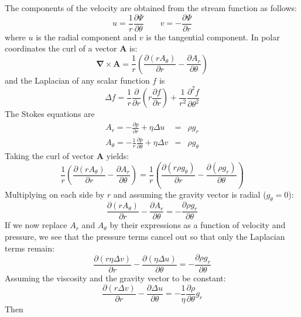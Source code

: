 

The components of the velocity are obtained from the stream function as follows:
\[
u = \frac{1}{r}\frac{\partial \Psi}{\partial \theta}
\quad\quad
v = - \frac{\partial \Psi}{\partial r}
\]
where $u$ is the radial component and $v$ is the tangential component.
In polar coordinates the curl of a vector ${\bm A}$ is:
\[
{\bm \nabla}\times {\bm A}
=
\frac{1}{r}\left(  
\frac{\partial (r A_\theta)}{\partial r}
-
\frac{\partial A_r}{\partial \theta}
\right)
\]
and the Laplacian of any scalar function $f$ is 
\[
\Delta f = \frac{1}{r} \frac{\partial }{\partial r} \left( r  \frac{\partial f}{\partial r} \right) 
+  \frac{1}{r^2} \frac{\partial^2 f}{\partial \theta^2} 
\]
The Stokes equations are
\begin{eqnarray}
A_r=-\frac{\partial p}{\partial r} + \eta \Delta u &=& \rho g_r \\
A_\theta=-\frac{1}{r}\frac{\partial p}{\partial \theta} + \eta \Delta v &=& \rho g_\theta 
\end{eqnarray}
Taking the curl of vector ${\bm A}$ yields:
\[
\frac{1}{r}\left(  
\frac{\partial (r A_\theta)}{\partial r}
- \frac{\partial A_r}{\partial \theta}
\right)
=
\frac{1}{r}\left(  
\frac{\partial (r \rho g_\theta)}{\partial r}
- \frac{\partial (\rho g_r)}{\partial \theta}
\right)
\]
Multiplying on each side by $r$ and assuming the gravity vector is radial ($g_\theta=0$):
\[
\frac{\partial (r A_\theta)}{\partial r}
- \frac{\partial A_r}{\partial \theta}
=
- \frac{\partial \rho g_r}{\partial \theta}
\]
If we now replace $A_r$ and $A_\theta$ by their expressions as a function of velocity and pressure, 
we see that the pressure terms cancel out so that only the Laplacian terms remain:
\[
\frac{\partial (r \eta \Delta v)}{\partial r}
- \frac{\partial (\eta \Delta u)}{\partial \theta}
=
- \frac{\partial \rho g_r}{\partial \theta}
\]
Assuming the viscosity and the gravity vector to be constant:
\[
\frac{\partial (r  \Delta v)}{\partial r}
- \frac{\partial  \Delta u}{\partial \theta}
=
- \frac{1}{\eta} \frac{\partial \rho }{\partial \theta} g_r
\]
Then
